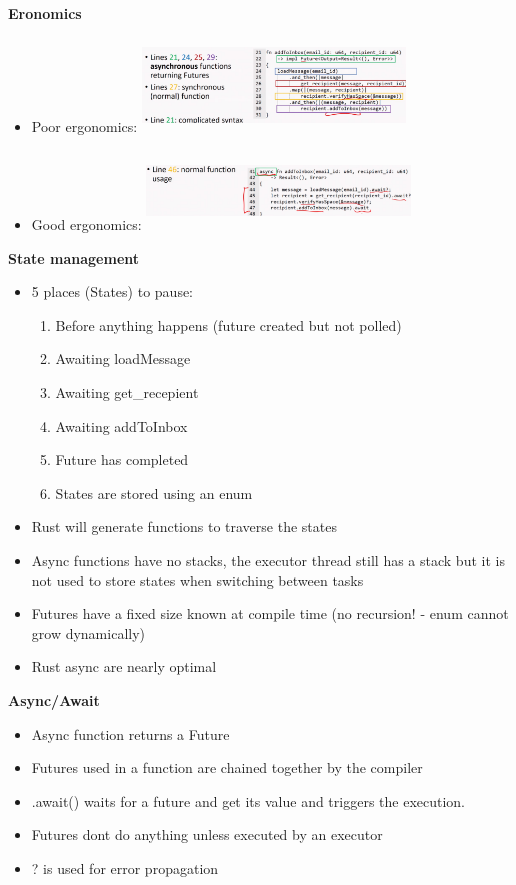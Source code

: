 \documentclass[10pt, landscape]{article}
\begin{document}
\begin{multicols}{4}
\textbf{Eronomics} \\
\begin{itemize}
    \item Poor ergonomics:
    \includegraphics*[width=7cm, height=2.5cm]{poorergonomics.png}
    \item Good ergonomics:
    \includegraphics*[width=7cm, height=2.1cm]{goodergonomics.png} 
\end{itemize}

\textbf{State management} \\
\begin{itemize}
    \item 5 places (States) to pause:
    \begin{enumerate}
        \item Before anything happens (future created but not polled)
        \item Awaiting loadMessage 
        \item Awaiting get\_recepient 
        \item Awaiting addToInbox 
        \item Future has completed
    \item States are stored using an enum
    \end{enumerate}
    \item Rust will generate functions to traverse the states 
    \item Async functions have no stacks, the executor thread still has a stack but it is not used to store states when switching between tasks 
    \item Futures have a fixed size known at compile time (no recursion! - enum cannot grow dynamically)
    \item Rust async are nearly optimal 
\end{itemize}

\textbf{Async/Await} \\
\begin{itemize}
    \item Async function returns a Future 
    \item Futures used in a function are chained together by the compiler
    \item .await() waits for a future and get its value and triggers the execution. 
    \item Futures dont do anything unless executed by an executor
    \item ? is used for error propagation
\end{itemize}


\end{multicols}
\end{document}

